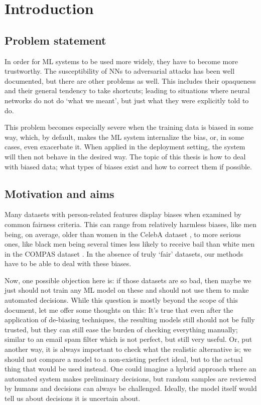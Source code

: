 \chapter{Introduction}\label{ch:introduction}
\section{Problem statement}
In order for \ac{ML} systems to be used more widely,
they have to become more trustworthy.
The susceptibility of \acp{NN} to adversarial attacks has been well documented, but there are other problems as well.
This includes their opaqueness and their general tendency to take shortcuts;
leading to situations where neural networks do not do `what we meant', but just what they were explicitly told to do.

This problem becomes especially severe when the training data is biased in some way,
which, by default, makes the \ac{ML} system internalize the bias, or, in some cases, even exacerbate it.
When applied in the deployment setting, the system will then not behave in the desired way.
The topic of this thesis is how to deal with biased data;
what types of biases exist and how to correct them if possible.

\section{Motivation and aims}
Many datasets with person-related features display biases when examined by common fairness criteria.
This can range from relatively harmless biases,
like men being, on average, older than women in the CelebA dataset \citep{liu2015faceattributes},
to more serious ones,
like black men being several times less likely to receive bail than white men in the COMPAS dataset \citep{angwin2016machine}.
In the absence of truly `fair' datasets, our methods have to be able to deal with these biases.

Now, one possible objection here is:
if those datasets are so bad,
then maybe we just should not train any \ac{ML} model on these and should not use them to make automated decisions.
While this question is mostly beyond the scope of this document, let me offer some thoughts on this:
It's true that even after the application of de-biasing techniques,
the resulting models still should not be fully trusted,
but they can still ease the burden of checking everything manually;
similar to an email spam filter which is not perfect, but still very useful.
Or, put another way, it is always important to check what the realistic alternative is;
we should not compare a model to a non-existing perfect ideal, but to the actual thing that would be used instead.
One could imagine a hybrid approach where an automated system makes preliminary decisions,
but random samples are reviewed by humans and decisions can always be challenged.
Ideally, the model itself would tell us about decisions it is uncertain about.

